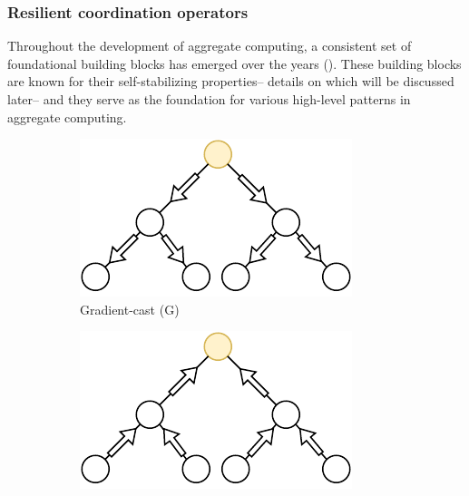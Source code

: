 \subsubsection{Resilient coordination operators}\label{sec:field-calculus-building-blocks}
Throughout the development of aggregate computing, 
 a consistent set of foundational building blocks has emerged over the years (). 
 These building blocks are known for their self-stabilizing properties--
 details on which will be discussed later--
 and they serve as the foundation for various high-level patterns in aggregate computing.
\begin{figure}
    \begin{subfigure}{0.3\textwidth}
        \centering
        \includegraphics[width=\textwidth]{chapters/img/g.drawio.pdf}
        \caption{Gradient-cast (G)}\label{fig:gradient-cast}
    \end{subfigure}
    \begin{subfigure}{0.3\textwidth}
        \centering
        \includegraphics[width=\textwidth]{chapters/img/c.drawio.pdf}

\end{subfigure}
\end{figure}

